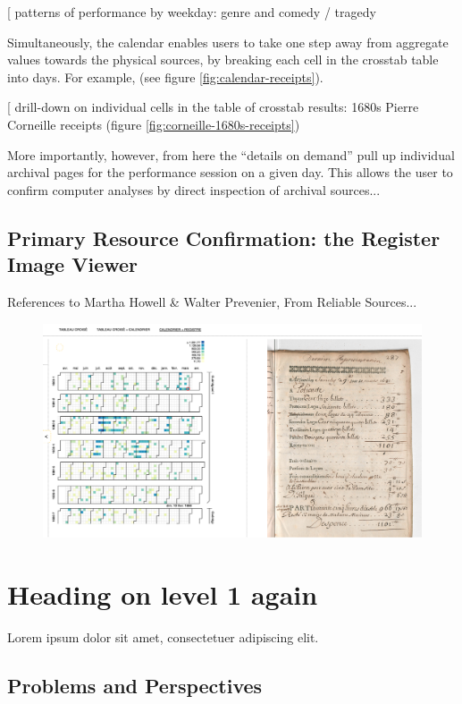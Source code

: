 \documentclass[	DIV=calc,%
							paper=a4,%
							fontsize=11pt,%
							twocolumn]{scrartcl}	 					%
\begin{document}
[ patterns of performance by weekday: genre and comedy / tragedy

Simultaneously, the calendar enables users to take one step away from aggregate values towards the physical sources, by breaking each cell in the crosstab table into days.  For example, (see figure \ref{fig:calendar-receipts}).

[ drill-down on individual cells in the table of crosstab results: 1680s Pierre Corneille receipts (figure \ref{fig:corneille-1680s-receipts})

More importantly, however, from here the ``details on demand'' pull up individual archival pages for the performance session on a given day.  This allows the user to confirm computer analyses by direct inspection of archival sources...

\subsection*{Primary Resource Confirmation: the Register Image Viewer}

References to Martha Howell \& Walter Prevenier, From Reliable Sources...

\begin{figure}
  \centering
	\includegraphics[width=7in]{steps/register-image-corneille.png}
	\caption{}
	\label{fig:register-image-corneille}
\end{figure}


\section*{Heading on level 1 again}
Lorem ipsum dolor sit amet, consectetuer adipiscing elit.

\subsection*{Problems and Perspectives}
\end{document}
